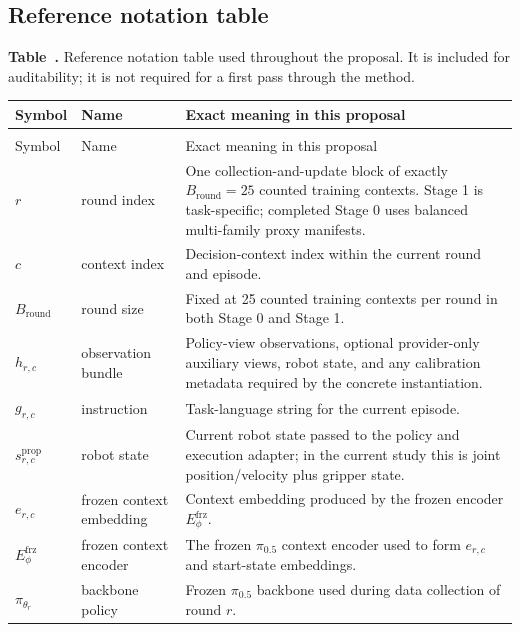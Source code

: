 \documentclass[10pt]{article}
\theoremstyle{plain}
\theoremstyle{definition}
\theoremstyle{remark}
\begin{document}
\subsection{Reference notation table}
{\footnotesize
{}\label{tab:master_notation}
\noindent\textbf{Table~\thetable.} Reference notation table used throughout the proposal. It is included for auditability; it is not required for a first pass through the method.
\par\smallskip
\setlength{\LTleft}{0pt}
\setlength{\LTright}{0pt}
\begin{longtable}{@{}>{\raggedright\arraybackslash}p{3.25cm}>{\raggedright\arraybackslash}p{2.55cm}>{\raggedright\arraybackslash}p{8.35cm}@{}}
\toprule
Symbol & Name & Exact meaning in this proposal \\
\midrule
\endfirsthead
\multicolumn{3}{@{}l@{}}{\emph{Table~\thetable{} continued.}}\\
\toprule
Symbol & Name & Exact meaning in this proposal \\
\midrule
\endhead
$r$ & round index & One collection-and-update block of exactly $B_{\mathrm{round}}=25$ counted training contexts. Stage 1 is task-specific; completed Stage 0 uses balanced multi-family proxy manifests. \\
$c$ & context index & Decision-context index within the current round and episode. \\
$B_{\mathrm{round}}$ & round size & Fixed at 25 counted training contexts per round in both Stage 0 and Stage 1. \\
$h_{r,c}$ & observation bundle & Policy-view observations, optional provider-only auxiliary views, robot state, and any calibration metadata required by the concrete instantiation. \\
$g_{r,c}$ & instruction & Task-language string for the current episode. \\
$s^{\mathrm{prop}}_{r,c}$ & robot state & Current robot state passed to the policy and execution adapter; in the current study this is joint position/velocity plus gripper state. \\
$e_{r,c}$ & frozen context embedding & Context embedding produced by the frozen encoder $E_{\phi}^{\mathrm{frz}}$. \\
$E_{\phi}^{\mathrm{frz}}$ & frozen context encoder & The frozen $\pi_{0.5}$ context encoder used to form $e_{r,c}$ and start-state embeddings. \\
$\pi_{\theta_r}$ & backbone policy & Frozen $\pi_{0.5}$ backbone used during data collection of round $r$. \\

\end{longtable}}
\end{document}
